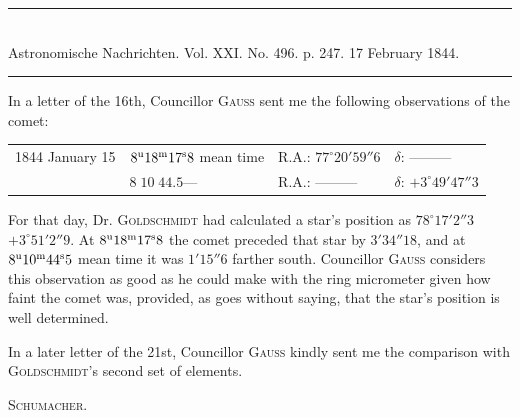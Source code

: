 \clearpage
\hypertarget{native-470-report}{}
\begin{center}
\rule{0.55\linewidth}{0.4pt}\\[2pt]
Astronomische Nachrichten. Vol. XXI. No. 496. p. 247. 17 February 1844.\\[2pt]
\rule{0.55\linewidth}{0.4pt}
\end{center}

In a letter of the 16th, Councillor \textsc{Gauss} sent me the following observations of the comet:
\begin{center}
\setlength{\tabcolsep}{3pt}
\begin{tabular}{l|l|l|l}
1844 January 15 & $8^{\rm u}18^{\rm m}17^{\rm s}8$ mean time & R.A.: $77^\circ20'59''6$ & $\delta$: ---\quad ---\quad --- \\
 & $8\;10\;44.5$\quad --- & R.A.: ---\quad ---\quad --- & $\delta$: $+3^\circ49'47''3$ \\
\end{tabular}
\end{center}

For that day, Dr. \textsc{Goldschmidt} had calculated a star’s position as $78^\circ17'2''3$ $+3^\circ51'2''9$. At $8^{\rm u}18^{\rm m}17^{\rm s}8$ the comet preceded that star by $3'34''18$, and at $8^{\rm u}10^{\rm m}44^{\rm s}5$ mean time it was $1'15''6$ farther south. Councillor \textsc{Gauss} considers this observation as good as he could make with the ring micrometer given how faint the comet was, provided, as goes without saying, that the star’s position is well determined.

In a later letter of the 21st, Councillor \textsc{Gauss} kindly sent me the comparison with \textsc{Goldschmidt}’s second set of elements.
\begin{flushright}\textsc{Schumacher.}\end{flushright}
